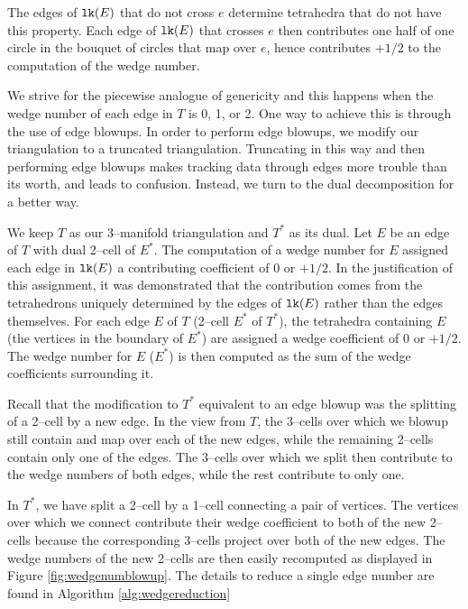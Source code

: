 The edges of $\texttt{lk}(E)$ that do not cross $e$ determine tetrahedra that do not have this property.
Each edge of $\texttt{lk}(E)$ that crosses $e$ then contributes one half of one circle in the bouquet of circles that map over $e$, hence contributes $+1/2$ to the computation of the wedge number.

We strive for the piecewise analogue of genericity and this happens when the wedge number of each edge in $T$ is 0, 1, or 2.
One way to achieve this is through the use of edge blowups.
In order to perform edge blowups, we modify our triangulation to a truncated triangulation.
Truncating in this way and then performing edge blowups makes tracking data through edges more trouble than its worth, and leads to confusion.
Instead, we turn to the dual decomposition for a better way.

We keep $T$ as our 3--manifold triangulation and $T^*$ as its dual.
Let $E$ be an edge of $T$ with dual 2--cell of $E^*$.
The computation of a wedge number for $E$ assigned each edge in $\texttt{lk}(E)$ a contributing coefficient of $0$ or $+1/2$.
In the justification of this assignment, it was demonstrated that the contribution comes from the tetrahedrons uniquely determined by the edges of $\texttt{lk}(E)$ rather than the edges themselves.
For each edge $E$ of $T$ (2--cell $E^*$ of $T^*$), the tetrahedra containing $E$ (the vertices in the boundary of $E^*$) are assigned a wedge coefficient of 0 or $+1/2$.
The wedge number for $E$ ($E^*$) is then computed as the sum of the wedge coefficients surrounding it.

Recall that the modification to $T^*$ equivalent to an edge blowup was the splitting of a 2--cell by a new edge.
In the view from $T$, the 3--cells over which we blowup still contain and map over each of the new edges, while the remaining 2--cells contain only one of the edges.
The 3--cells over which we split then contribute to the wedge numbers of both edges, while the rest contribute to only one.

In $T^*$, we have split a 2--cell by a 1--cell connecting a pair of vertices.
The vertices over which we connect contribute their wedge coefficient to both of the new 2--cells because the corresponding 3--cells project over both of the new edges.
The wedge numbers of the new 2--cells are then easily recomputed as displayed in Figure \ref{fig:wedgenumblowup}.
The details to reduce a single edge number are found in Algorithm \ref{alg:wedgereduction}

